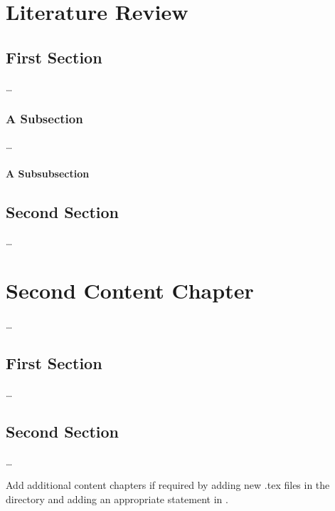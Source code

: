 
\chapter{Literature Review}
\label{ch:literature-review}

\section{First Section}
\label{sec:FirstContent:FirstSection}

\dots

\subsection{A Subsection}
\label{sec:FirstContent:FirstSubSection}

\dots

\subsubsection{A Subsubsection}

\section{Second Section}
\label{sec:FirstContent:SecondSection}

\dots


\chapter{Second Content Chapter}
\label{ch:SecondContent}

\dots

\section{First Section}
\label{sec:SecondContent:FirstSection}

\dots

\section{Second Section}
\label{sec:SecondContent:SecondSection}

\dots

Add additional content chapters if required by adding new .tex files in the
 directory and adding an appropriate 
 statement in . 
